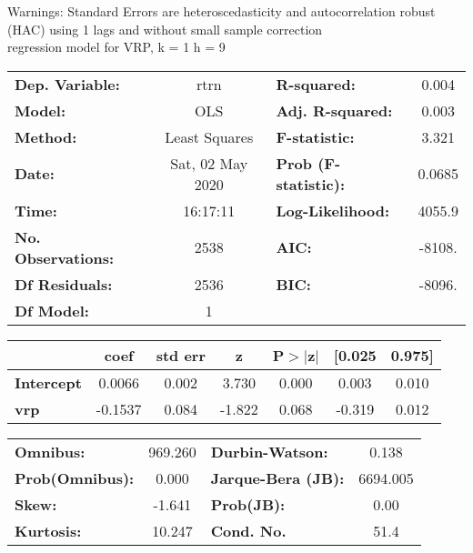 Warnings: \newline
 [1] Standard Errors are heteroscedasticity and autocorrelation robust (HAC) using 1 lags and without small sample correction\\ 

regression model for VRP, k = 1 h = 9\begin{center}
\begin{tabular}{lclc}
\toprule
\textbf{Dep. Variable:}    &       rtrn       & \textbf{  R-squared:         } &     0.004   \\
\textbf{Model:}            &       OLS        & \textbf{  Adj. R-squared:    } &     0.003   \\
\textbf{Method:}           &  Least Squares   & \textbf{  F-statistic:       } &     3.321   \\
\textbf{Date:}             & Sat, 02 May 2020 & \textbf{  Prob (F-statistic):} &   0.0685    \\
\textbf{Time:}             &     16:17:11     & \textbf{  Log-Likelihood:    } &    4055.9   \\
\textbf{No. Observations:} &        2538      & \textbf{  AIC:               } &    -8108.   \\
\textbf{Df Residuals:}     &        2536      & \textbf{  BIC:               } &    -8096.   \\
\textbf{Df Model:}         &           1      & \textbf{                     } &             \\
\bottomrule
\end{tabular}
\begin{tabular}{lcccccc}
                   & \textbf{coef} & \textbf{std err} & \textbf{z} & \textbf{P$> |$z$|$} & \textbf{[0.025} & \textbf{0.975]}  \\
\midrule
\textbf{Intercept} &       0.0066  &        0.002     &     3.730  &         0.000        &        0.003    &        0.010     \\
\textbf{vrp}       &      -0.1537  &        0.084     &    -1.822  &         0.068        &       -0.319    &        0.012     \\
\bottomrule
\end{tabular}
\begin{tabular}{lclc}
\textbf{Omnibus:}       & 969.260 & \textbf{  Durbin-Watson:     } &    0.138  \\
\textbf{Prob(Omnibus):} &   0.000 & \textbf{  Jarque-Bera (JB):  } & 6694.005  \\
\textbf{Skew:}          &  -1.641 & \textbf{  Prob(JB):          } &     0.00  \\
\textbf{Kurtosis:}      &  10.247 & \textbf{  Cond. No.          } &     51.4  \\
\bottomrule
\end{tabular}
\end{center}

